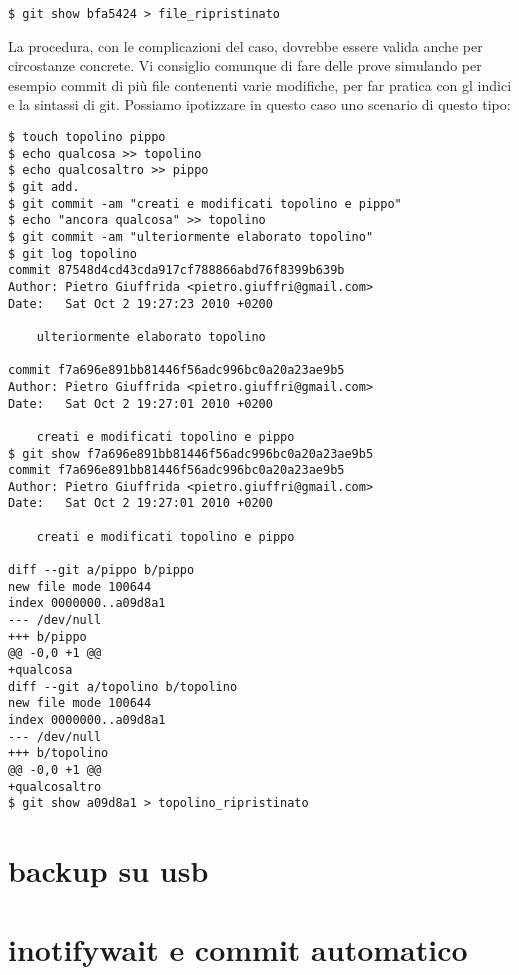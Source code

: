 \documentclass{article}
\begin{document}
\begin{framed}
\begin{lstlisting}
$ git show bfa5424 > file_ripristinato
\end{lstlisting}
\end{framed}

La procedura, con le complicazioni del caso, dovrebbe essere valida anche per
circostanze concrete. Vi consiglio comunque di fare delle prove simulando per
esempio commit di più file contenenti varie modifiche, per far pratica con gl
indici e la sintassi di git.
Possiamo ipotizzare in questo caso uno scenario di questo tipo:
\begin{framed}
\begin{lstlisting}
$ touch topolino pippo
$ echo qualcosa >> topolino
$ echo qualcosaltro >> pippo
$ git add.
$ git commit -am "creati e modificati topolino e pippo"
$ echo "ancora qualcosa" >> topolino
$ git commit -am "ulteriormente elaborato topolino"
$ git log topolino
commit 87548d4cd43cda917cf788866abd76f8399b639b
Author: Pietro Giuffrida <pietro.giuffri@gmail.com>
Date:   Sat Oct 2 19:27:23 2010 +0200

    ulteriormente elaborato topolino

commit f7a696e891bb81446f56adc996bc0a20a23ae9b5
Author: Pietro Giuffrida <pietro.giuffri@gmail.com>
Date:   Sat Oct 2 19:27:01 2010 +0200

    creati e modificati topolino e pippo
$ git show f7a696e891bb81446f56adc996bc0a20a23ae9b5
commit f7a696e891bb81446f56adc996bc0a20a23ae9b5
Author: Pietro Giuffrida <pietro.giuffri@gmail.com>
Date:   Sat Oct 2 19:27:01 2010 +0200

    creati e modificati topolino e pippo

diff --git a/pippo b/pippo
new file mode 100644
index 0000000..a09d8a1
--- /dev/null
+++ b/pippo
@@ -0,0 +1 @@
+qualcosa
diff --git a/topolino b/topolino
new file mode 100644
index 0000000..a09d8a1
--- /dev/null
+++ b/topolino
@@ -0,0 +1 @@
+qualcosaltro
$ git show a09d8a1 > topolino_ripristinato
\end{lstlisting}
\end{framed}

\section{backup su usb}
\section{inotifywait e commit automatico}
\end{document}
